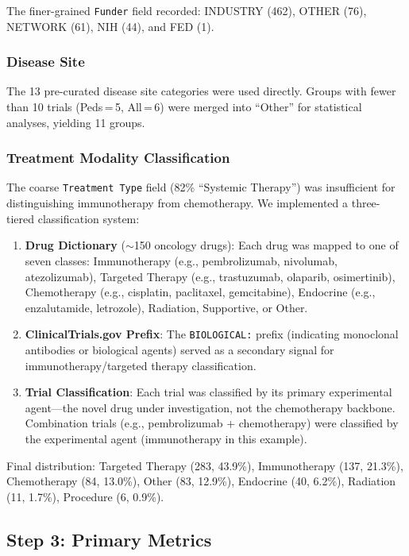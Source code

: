 \documentclass[11pt,a4paper]{article}
\begin{document}
The finer-grained \texttt{Funder} field recorded: INDUSTRY (462), OTHER (76), NETWORK (61), NIH (44), and FED (1).

\subsubsection{Disease Site}

The 13 pre-curated disease site categories were used directly. Groups with fewer than 10 trials (Peds\,=\,5, All\,=\,6) were merged into ``Other'' for statistical analyses, yielding 11 groups.

\subsubsection{Treatment Modality Classification}

The coarse \texttt{Treatment Type} field (82\% ``Systemic Therapy'') was insufficient for distinguishing immunotherapy from chemotherapy. We implemented a three-tiered classification system:

\begin{enumerate}
    \item \textbf{Drug Dictionary} ($\sim$150 oncology drugs): Each drug was mapped to one of seven classes: Immunotherapy (e.g., pembrolizumab, nivolumab, atezolizumab), Targeted Therapy (e.g., trastuzumab, olaparib, osimertinib), Chemotherapy (e.g., cisplatin, paclitaxel, gemcitabine), Endocrine (e.g., enzalutamide, letrozole), Radiation, Supportive, or Other.

    \item \textbf{ClinicalTrials.gov Prefix}: The \texttt{BIOLOGICAL:} prefix (indicating monoclonal antibodies or biological agents) served as a secondary signal for immunotherapy/targeted therapy classification.

    \item \textbf{Trial Classification}: Each trial was classified by its primary experimental agent---the novel drug under investigation, not the chemotherapy backbone. Combination trials (e.g., pembrolizumab + chemotherapy) were classified by the experimental agent (immunotherapy in this example).
\end{enumerate}

Final distribution: Targeted Therapy (283, 43.9\%), Immunotherapy (137, 21.3\%), Chemotherapy (84, 13.0\%), Other (83, 12.9\%), Endocrine (40, 6.2\%), Radiation (11, 1.7\%), Procedure (6, 0.9\%).

\subsection{Step 3: Primary Metrics}
\end{document}
